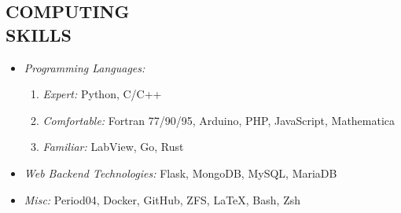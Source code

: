 \documentclass[margin, 10pt]{res} %
\begin{document}
\begin{resume}
\section{COMPUTING \\ SKILLS} 

\begin{itemize}
\item {\sl Programming Languages:} 
    \begin{enumerate}
        \item{\sl Expert: } Python, C/C++
        \item{\sl Comfortable: } Fortran 77/90/95, Arduino, PHP, JavaScript, Mathematica
        \item{\sl Familiar: } LabView, Go, Rust 
    \end{enumerate}
\item {\sl Web Backend Technologies:} Flask, MongoDB, MySQL, MariaDB
\item {\sl Misc:} Period04, Docker, GitHub, ZFS, LaTeX, Bash, Zsh
\end{itemize}
 
 



\end{resume}
\end{document}
